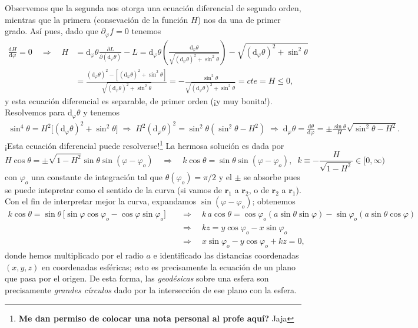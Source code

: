 \documentclass{article}
\begin{document}
Observemos que la segunda nos otorga una ecuaci\'on diferencial de segundo orden, mientras que la primera (consevaci\'on de la funci\'on $H$) nos da una de primer grado. As\'i pues, dado que $\partial_\varphi f=0$ tenemos
\begin{align}
    \frac{\mathrm{d}H}{\mathrm{d}\varphi}=0 \quad\Rightarrow\quad H&=\mathrm{d}_\varphi\theta \frac{\partial L}{\partial (\mathrm{d}_\varphi \theta)} - L = \mathrm{d}_\varphi\theta \left(\frac{\mathrm{d}_\varphi \theta}{\sqrt{(\mathrm{d}_\varphi\theta)^2+\sin^2\theta}}\right) - \sqrt{(\mathrm{d}_\varphi\theta)^2+\sin^2\theta} \nonumber \\
    &=\frac{(\mathrm{d}_\varphi \theta)^2-[(\mathrm{d}_\varphi\theta)^2+\sin^2\theta]}{\sqrt{(\mathrm{d}_\varphi\theta)^2+\sin^2\theta}} = -\frac{\sin^2\theta}{\sqrt{(\mathrm{d}_\varphi\theta)^2+\sin^2\theta}} = cte = H\leq0,
\end{align}
y esta ecuaci\'on diferencial es separable, de primer orden (¡y muy bonita!). Resolvemos para $\mathrm{d}_\varphi\theta$ y tenemos
\begin{align}
    \sin^4\theta = H^2 \bigl[(\mathrm{d}_\varphi\theta)^2 + \sin^2\theta\bigr] 
    \;\Rightarrow\; 
    H^2(\mathrm{d}_\varphi \theta)^2 = \sin^2\theta(\sin^2\theta - H^2) 
    \;\Rightarrow\; \mathrm{d}_\varphi\theta=\frac{\mathrm{d}\theta}{\mathrm{d}\varphi}=\pm\frac{\sin\theta}{H}\sqrt{\sin^2\theta - H^2}.
\end{align}
¡Esta ecuaci\'on diferencial puede resolverse!\footnote{\textbf{Me dan permiso de colocar una nota personal al profe aqu\'i?} Jaja} La hermosa soluci\'on es dada por
\begin{equation}
    H\cos\theta = \pm\sqrt{1-H^2}\sin\theta\sin(\varphi-\varphi_o)
    \quad\Rightarrow\quad
    k\cos\theta=\sin\theta\sin(\varphi-\varphi_o), \;\; k\equiv-\frac{H}{\sqrt{1-H^2}}\in[0,\infty)
\end{equation}
con $\varphi_o$ una constante de integraci\'on tal que $\theta(\varphi_o)=\pi/2$ y el $\pm$ se absorbe pues se puede intepretar como el sentido de la curva (si vamos de $\mathbf{r}_1$ a $\mathbf{r}_2$, o de $\mathbf{r}_2$ a $\mathbf{r}_1$). Con el fin de interpretar mejor la curva, expandamos $\sin(\varphi-\varphi_o)$; obtenemos
\begin{align}
    k\cos\theta = \sin\theta\, \bigl[\sin\varphi\cos\varphi_o - \cos\varphi\sin\varphi_o \bigr] 
    \quad&\Rightarrow\quad 
    k\,a\cos\theta = \cos\varphi_o (a\sin\theta\sin\varphi) - \sin\varphi_o(a\sin\theta\cos\varphi) \nonumber \\
    &\Rightarrow\quad kz=y\cos\varphi_o - x\sin\varphi_o \nonumber \\
    &\Rightarrow\quad x\sin\varphi_o - y\cos\varphi_o + kz=0,
\end{align}
donde hemos multiplicado por el radio $a$ e identificado las distancias coordenadas $(x,y,z)$ en coordenadas esf\'ericas; esto es precisamente la ecuaci\'on de un plano que pasa por el origen. De esta forma, las \textit{geod\'esicas} sobre una esfera son precisamente \textit{grandes c\'irculos} dado por la intersecci\'on de ese plano con la esfera.
\end{document}
